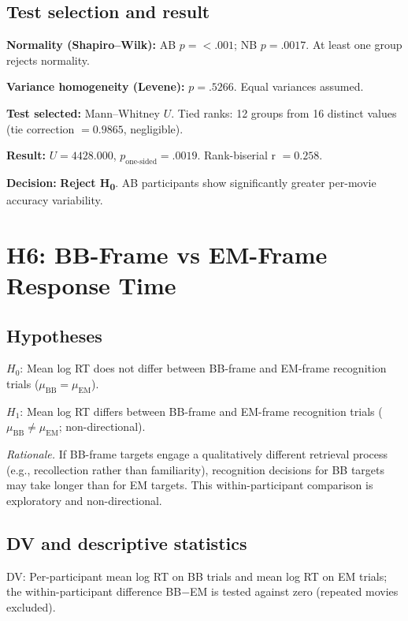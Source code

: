 \documentclass[12pt,a4paper]{article}
\begin{document}
\subsection{Test selection and result}

\textbf{Normality (Shapiro--Wilk):} AB $p = <.001$; NB $p = .0017$. At least one group rejects normality.

\textbf{Variance homogeneity (Levene):} $p = .5266$. Equal variances assumed.


\textbf{Test selected:} Mann--Whitney $U$. Tied ranks: 12 groups from 16 distinct values (tie correction $= 0.9865$, negligible).

\textbf{Result:} $U = 4428.000$, $p_{\text{one-sided}} = .0019$. Rank-biserial r $= 0.258$.

\textbf{Decision:} \textbf{Reject H\textsubscript{0}}. AB participants show significantly greater per-movie accuracy variability.


\section{H6: BB-Frame vs EM-Frame Response Time}

\subsection{Hypotheses}
$H_0$: Mean log RT does not differ between BB-frame and EM-frame recognition trials
($\mu_\text{BB} = \mu_\text{EM}$).

$H_1$: Mean log RT differs between BB-frame and EM-frame recognition trials
($\mu_\text{BB} \neq \mu_\text{EM}$; non-directional).

\textit{Rationale.} If BB-frame targets engage a qualitatively different retrieval process
(e.g., recollection rather than familiarity), recognition decisions for BB targets may take
longer than for EM targets. This within-participant comparison is exploratory and non-directional.

\subsection{DV and descriptive statistics}
DV: Per-participant mean log RT on BB trials and mean log RT on EM trials; the within-participant
difference BB$-$EM is tested against zero (repeated movies excluded).
\end{document}
